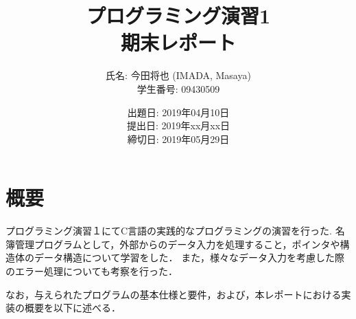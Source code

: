 \documentclass[a4j,11pt]{jarticle}
\title{プログラミング演習1 \\
       期末レポート}
\author{氏名: 今田将也 (IMADA, Masaya) \\
        学生番号: 09430509}
\date{出題日: 2019年04月10日 \\
      提出日: 2019年xx月xx日 \\
      締切日: 2019年05月29日 \\}  %
\begin{document}
\maketitle



\section{概要}\label{sec:gaiyou}

プログラミング演習１にてC言語の実践的なプログラミングの演習を行った. 
名簿管理プログラムとして，外部からのデータ入力を処理すること，ポインタや構造体のデータ構造について学習をした．
また，様々なデータ入力を考慮した際のエラー処理についても考察を行った．

なお，与えられたプログラムの基本仕様と要件，および，本レポートにおける実装の概要を以下に述べる．
\end{document}
